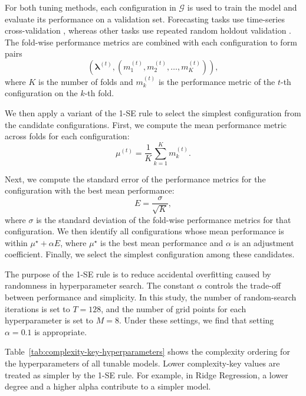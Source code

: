 For both tuning methods, each configuration in \(\mathcal{G}\) is used to train the model and evaluate its performance on a validation set. Forecasting tasks use time-series cross-validation \cite{hyndman2018forecasting}, whereas other tasks use repeated random holdout validation \cite{kohavi1995study}. The fold-wise performance metrics are combined with each configuration to form pairs
\[
	\left(\bm{\lambda}^{(t)}, \left(m_1^{(t)}, m_2^{(t)}, \dots, m_K^{(t)}\right)\right),
\]
where \(K\) is the number of folds and \(m_k^{(t)}\) is the performance metric of the \(t\)-th configuration on the \(k\)-th fold.

We then apply a variant of the 1-SE rule \cite{little2019statistical} to select the simplest configuration from the candidate configurations. First, we compute the mean performance metric across folds for each configuration:
\[
	\mu^{(t)} = \frac{1}{K} \sum_{k=1}^K m_k^{(t)}.
\]

Next, we compute the standard error of the performance metrics for the configuration with the best mean performance:
\[
	E = \frac{\sigma}{\sqrt{K}},
\]
where \(\sigma\) is the standard deviation of the fold-wise performance metrics for that configuration. We then identify all configurations whose mean performance is within \(\mu^\star + \alpha E\), where \(\mu^\star\) is the best mean performance and \(\alpha\) is an adjustment coefficient. Finally, we select the simplest configuration among these candidates.

The purpose of the 1-SE rule is to reduce accidental overfitting caused by randomness in hyperparameter search. The constant \(\alpha\) controls the trade-off between performance and simplicity. In this study, the number of random-search iterations is set to \(T = 128\), and the number of grid points for each hyperparameter is set to \(M = 8\). Under these settings, we find that setting \(\alpha = 0.1\) is appropriate.

Table~\ref{tab:complexity-key-hyperparameters} shows the complexity ordering for the hyperparameters of all tunable models. Lower complexity-key values are treated as simpler by the 1-SE rule. For example, in Ridge Regression, a lower degree and a higher alpha contribute to a simpler model.

